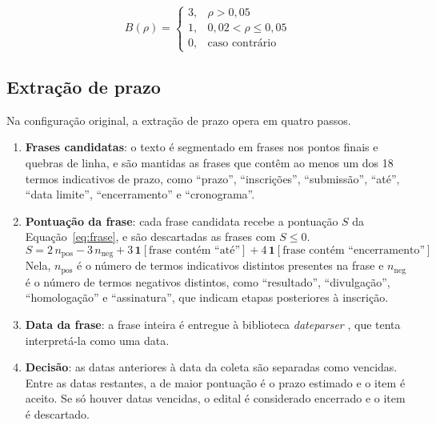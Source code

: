 \begin{equation}
\label{eq:bonus}
B(\rho) =
\begin{cases}
3, & \rho > 0{,}05 \\
1, & 0{,}02 < \rho \leq 0{,}05 \\
0, & \text{caso contrário}
\end{cases}
\end{equation}

\subsection{Extração de prazo}
\label{subsec:prazo}

Na configuração original, a extração de prazo opera em quatro passos.

\begin{enumerate}
  \item \textbf{Frases candidatas}: o texto é segmentado em frases nos pontos
    finais e quebras de linha, e são mantidas as frases que contêm ao menos um
    dos 18 termos indicativos de prazo, como ``prazo'', ``inscrições'',
    ``submissão'', ``até'', ``data limite'', ``encerramento'' e
    ``cronograma''.
  \item \textbf{Pontuação da frase}: cada frase candidata recebe a pontuação
    $S$ da Equação~\eqref{eq:frase}, e são descartadas as frases com
    $S \leq 0$.
    \begin{equation}
    \label{eq:frase}
    S = 2\, n_{\mathrm{pos}} - 3\, n_{\mathrm{neg}}
        + 3\,\mathbf{1}[\text{frase contém ``até''}]
        + 4\,\mathbf{1}[\text{frase contém ``encerramento''}]
    \end{equation}
    Nela, $n_{\mathrm{pos}}$ é o número de termos indicativos distintos presentes
    na frase e $n_{\mathrm{neg}}$ é o número de termos negativos distintos, como
    ``resultado'', ``divulgação'', ``homologação'' e ``assinatura'', que
    indicam etapas posteriores à inscrição.
  \item \textbf{Data da frase}: a frase inteira é entregue à biblioteca
    \textit{dateparser} \cite{dateparser}, que tenta interpretá-la como uma data.
  \item \textbf{Decisão}: as datas anteriores à data da coleta são separadas
    como vencidas. Entre as datas restantes, a de maior pontuação é o prazo
    estimado e o item é aceito. Se só houver datas vencidas, o edital é
    considerado encerrado e o item é descartado.
\end{enumerate}

